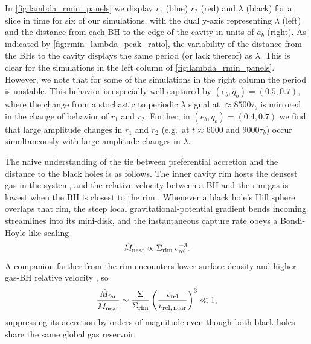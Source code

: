 \documentclass[fleqn,usenatbib]{mnras}
\begin{document}
In \autoref{fig:lambda_rmin_panels} we display $r_1$ (blue) $r_2$ (red) and $\lambda$ (black) for a slice in time for six of our simulations, with the dual y-axis representing $\lambda$ (left) and the distance from each BH to the edge of the cavity in units of $a_b$ (right). As indicated by \autoref{fig:rmin_lambda_peak_ratio}, the variability of the distance from the BHs to the cavity displays the same period (or lack thereof) as $\lambda$. This is clear for the simulations in the left column of \autoref{fig:lambda_rmin_panels}. However, we note that for some of the simulations in the right column the period is unstable. This behavior is especially well captured by $(e_b, q_b) = (0.5, 0.7)$, where the change from a stochastic to periodic $\lambda$ signal at $\approx 8500 \tau_b$ is mirrored in the change of behavior of $r_1$ and $r_2$. Further, in $(e_b, q_b) = (0.4, 0.7)$ we find that large amplitude changes in $r_1$ and $r_2$ (e.g.\ at $t \approx 6000$ and $9000 \tau_b$) occur simultaneously with large amplitude changes in $\lambda$.

The naive understanding of the tie between preferential accretion and the distance to the black holes is as follows. The inner cavity rim hosts the densest gas in the system, and the relative velocity between a BH and the rim gas is lowest when the BH is closest to the rim \citep{shi_2012, farris_2014, duffell_dorazio_2020}. Whenever a black hole's Hill sphere overlaps that rim, the steep local gravitational-potential gradient bends incoming streamlines into its mini-disk, and the instantaneous capture rate obeys a Bondi-Hoyle-like scaling
\begin{equation}
  \dot{M}_{\rm near} \propto \Sigma_{\rm rim} \, v_{\rm rel}^{-3}.
\end{equation}
A companion farther from the rim encounters lower surface density and higher gas-BH relative velocity \citep{miranda_munoz_lai_2017, dorazio_duffel}, so
\begin{equation}
  \frac{\dot{M}_{\rm far}}{\dot{M}_{\rm near}} \sim \frac{\Sigma}{\Sigma_{\rm rim}} \left(\frac{v_{\rm rel}}{v_{\rm rel,\,near}}\right)^{3} \ll 1,
\end{equation}
suppressing its accretion by orders of magnitude even though both black holes share the same global gas reservoir.
\end{document}
